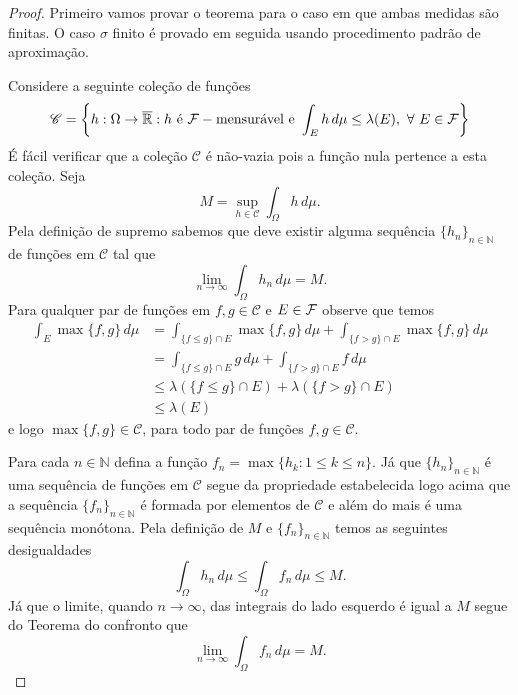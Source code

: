 \begin{proof}
Primeiro vamos provar o teorema para o caso em que ambas
medidas são finitas. O caso $\sigma$ finito é provado 
em seguida usando procedimento padrão de aproximação.

Considere a seguinte coleção de funções 
\[
\mathscr{C}
=
\left\{
h:\Omega\to\overline{\mathbb{R}}
: h\ \text{é}\ \F-\text{mensurável e}\ 
\int_{E}h\, d\mu \leq \lambda(E), \ \forall\ E\in\F 
\right\}
\]
É fácil verificar que a coleção $\mathscr{C}$ é não-vazia
pois a função nula pertence a esta coleção.
Seja 
\[
M= \sup_{h\in\mathscr{C}} \int_{\Omega} h\, d\mu.
\]
Pela definição de supremo sabemos que deve existir 
alguma sequência $\{h_n\}_{n\in\mathbb{N}}$ de 
funções em $\mathscr{C}$ tal que 
\[
\lim_{n\to\infty} \int_{\Omega}h_n\, d\mu 
=
M.
\]
Para qualquer par de funções em $f,g\in \mathscr{C}$ e 
$E\in \mathcal{F}$ observe que temos 
\begin{align*}
\int_{E} \max\{f,g\}\, d\mu
&=
\int_{\{f\leq g\}\cap E} 
\!\!\!\!\max\{f,g\}\, d\mu
+
\int_{\{f>g\}\cap E} 
\!\!\!\!\max\{f,g\}\, d\mu
\\[0.3cm]
&=
\int_{\{f\leq g\}\cap E} 
\!\!\!\! g \, d\mu
+
\int_{\{f>g\}\cap E} 
\!\!\!\! f\, d\mu
\\[0.3cm]
&\leq
\lambda(\{f\leq g\}\cap E) 
+
\lambda(\{f> g\}\cap E)
\\[0.3cm]
&\leq
\lambda(E) 
\end{align*}
e logo $\max\{f,g\}\in \mathscr{C}$, 
para todo par de funções $f,g\in\mathscr{C}$. 

Para cada $n\in\mathbb{N}$ defina 
a função $f_n = \max\{h_k:1\leq k\leq n\}$.
Já que $\{h_n\}_{n\in\mathbb{N}}$ é uma sequência de 
funções em $\mathscr{C}$ segue
da propriedade estabelecida logo acima que
a sequência $\{f_n\}_{n\in\mathbb{N}}$ é formada  
por elementos de $\mathscr{C}$ e além do mais 
é uma sequência monótona.
Pela definição de $M$ e $\{f_n\}_{n\in\mathbb{N}}$
temos as seguintes desigualdades 
\[
\int_{\Omega} h_n\, d\mu
\leq
\int_{\Omega} f_n\, d\mu
\leq 
M.
\]
Já que o limite, quando $n\to\infty$, 
das integrais do lado esquerdo é igual a $M$
segue do Teorema do confronto que
\[
\lim_{n\to\infty}
\int_{\Omega} f_n\, d\mu
=
M.
\]


\end{proof}
